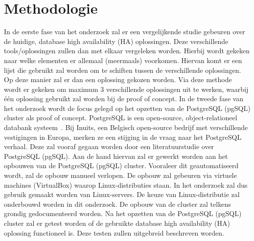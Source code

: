 \section{Methodologie}
\label{sec:methodologie}
In de eerste fase van het onderzoek zal er een vergelijkende studie gebeuren over de huidige, database high availability (HA) oplossingen. Deze verschillende tools/oplossingen zullen dan met elkaar vergeleken worden. Hierbij wordt gekeken naar welke elementen er allemaal (meermaals) voorkomen. Hiervan komt er een lijst die gebruikt zal worden om te schiften tussen de verschillende oplossingen. Op deze manier zal er dan een oplossing gekozen worden. Via deze methode wordt er gekeken om maximum 3 verschillende oplossingen uit te werken, waarbij één oplossing gebruikt zal worden bij de proof of concept.
In de tweede fase van het onderzoek wordt de focus gelegd op het opzetten van de PostgreSQL (pgSQL) cluster als proof of concept. PostgreSQL is een open-source, object-relationeel databank systeem~\autocite{PostgreSQL2020}. Bij Inuits, een Belgisch open-source bedrijf met verschillende vestigingen in Europa, merken ze een stijging in de vraag naar het PostgreSQL verhaal.
Deze zal vooraf gegaan worden door een literatuurstudie over PostgreSQL (pgSQL). Aan de hand hiervan zal er gewerkt worden aan het opbouwen van de PostgreSQL (pgSQL) cluster. Vooraleer dit geautomatiseerd wordt, zal de opbouw manueel verlopen. De opbouw zal gebeuren via virtuele machines (VirtualBox) waarop Linux-distributies staan. In het onderzoek zal dus gebruik gemaakt worden van Linux-servers. De keuze van Linux-distributie zal onderbouwd worden in dit onderzoek. De opbouw van de cluster zal telkens grondig gedocumenteerd worden. %
Na het opzetten van de PostgreSQL (pgSQL) cluster zal er getest worden of de gebruikte database high availability (HA) oplossing functioneel is. Deze testen zullen uitgebreid beschreven worden.




